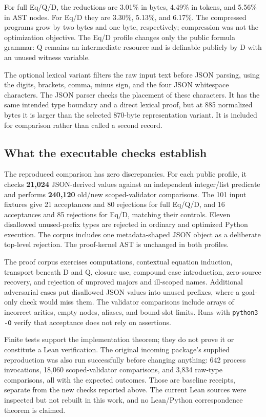 \documentclass[11pt,letterpaper]{article}
\theoremstyle{definition}
\theoremstyle{remark}
\begin{document}
For full Eq/Q/D, the reductions are 3.01\% in bytes, 4.49\% in tokens,
and 5.56\% in AST nodes. For Eq/D they are 3.30\%, 5.13\%, and 6.17\%.
The compressed programs grow by two bytes and one byte, respectively;
compression was not the optimization objective. The Eq/D profile changes
only the public formula grammar: Q remains an intermediate resource and is
definable publicly by D with an unused witness variable.

The optional lexical variant filters the raw input text before JSON parsing,
using the digits, brackets, comma, minus sign, and the four JSON whitespace
characters. The JSON parser checks the placement of these characters.
It has the same intended type boundary and a direct lexical proof, but at
885 normalized bytes it is larger than the selected 870-byte representation
variant. It is included for comparison rather than called a second record.

\subsection{What the executable checks establish}
The reproduced comparison has zero discrepancies. For each public profile, it checks \textbf{21,024} JSON-derived values against an independent integer/list predicate and performs \textbf{240,120} old/new scoped-validator comparisons. The 101 input fixtures give 21 acceptances and 80 rejections for full Eq/Q/D, and 16 acceptances and 85 rejections for Eq/D, matching their controls. Eleven disallowed unused-prefix types are rejected in ordinary and optimized Python execution. The corpus includes one metadata-shaped JSON object as a deliberate top-level rejection. The proof-kernel AST is unchanged in both profiles.


The proof corpus exercises computations, contextual equation induction,
transport beneath D and Q, closure use, compound case introduction,
zero-source recovery, and rejection of unproved majors and ill-scoped
names. Additional adversarial cases put disallowed JSON values into unused
prefixes, where a goal-only check would miss them. The validator comparisons
include arrays of incorrect arities, empty nodes, aliases, and bound-slot
limits. Runs with \texttt{python3 -O} verify that acceptance does not rely
on assertions.

Finite tests support the implementation theorem; they do not prove it or
constitute a Lean verification. The original incoming package's supplied
reproduction was also run successfully before changing anything: 642 process
invocations, 18,060 scoped-validator comparisons, and 3,834 raw-type
comparisons, all with the expected outcomes. Those are baseline receipts,
separate from the new checks reported above. The current Lean sources were
inspected but not rebuilt in this work, and no Lean/Python correspondence
theorem is claimed.
\end{document}

